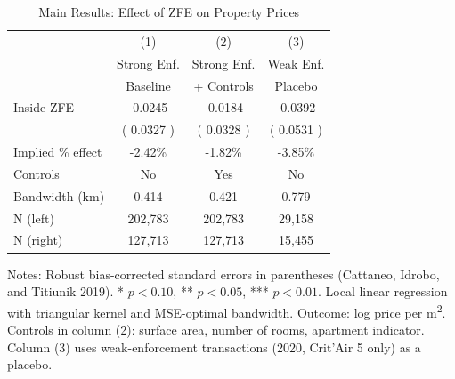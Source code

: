 \begin{table}[H]
\centering
\caption{Main Results: Effect of ZFE on Property Prices}
\begin{threeparttable}
\begin{tabular}{lccc}
\toprule
 & (1) & (2) & (3) \\
 & Strong Enf. & Strong Enf. & Weak Enf. \\
 & Baseline & + Controls & Placebo \\
\midrule
Inside ZFE &  -0.0245  &  -0.0184  &  -0.0392  \\
 & ( 0.0327 ) & ( 0.0328 ) & ( 0.0531 ) \\
\addlinespace
Implied \% effect &  -2.42\%  &  -1.82\%  &  -3.85\%  \\
\addlinespace
Controls & No & Yes & No \\
Bandwidth (km) &  0.414  &  0.421  &  0.779  \\
N (left) &  202,783  &  202,783  &  29,158  \\
N (right) &  127,713  &  127,713  &  15,455  \\
\bottomrule
\end{tabular}
\begin{tablenotes}[flushleft]
\small
\item Notes: Robust bias-corrected standard errors in parentheses  (Cattaneo, Idrobo, and Titiunik 2019).  * $p<0.10$, ** $p<0.05$, *** $p<0.01$.  Local linear regression with triangular kernel and MSE-optimal bandwidth.  Outcome: log price per m\textsuperscript{2}.  Controls in column (2): surface area, number of rooms, apartment indicator.  Column (3) uses weak-enforcement transactions (2020, Crit'Air 5 only) as a placebo.
\end{tablenotes}
\end{threeparttable}
\label{tab:main}
\end{table}
